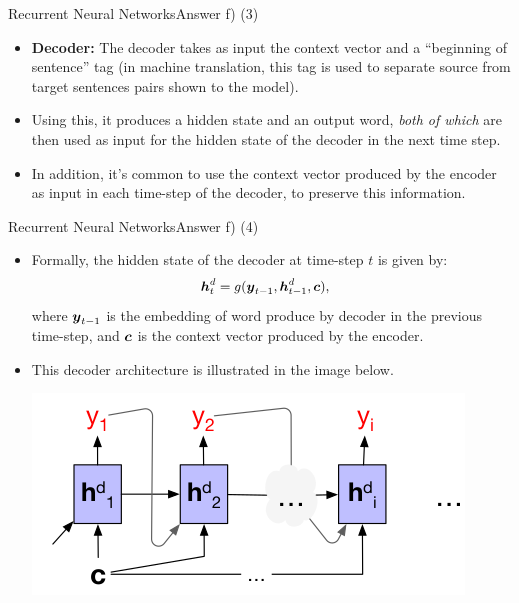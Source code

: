 \documentclass[t]{beamer}
\begin{document}
\begin{frame}{Recurrent Neural Networks}{Answer f) (3)}
    \begin{itemize}
        \item \textbf{Decoder:} The decoder takes as input the context vector
              and a ``beginning of sentence'' tag (in machine translation, this
              tag is used to separate source from target sentences pairs shown
              to the model).
        \item Using this, it produces a hidden state and an output word,
              \emph{both of which} are then used as input for the hidden state
              of the decoder in the next time step.
        \item In addition, it's common to use the context vector produced by
              the encoder as input in each time-step of the decoder, to preserve
              this information.
    \end{itemize}
\end{frame}

\begin{frame}{Recurrent Neural Networks}{Answer f) (4)}
    \begin{itemize}
        \item Formally, the hidden state of the decoder at time-step $t$ is
              given by:
              \begin{align*}
                  {\boldsymbol{h}}_t^d & = g({\boldsymbol{y}}_{t-1},{\boldsymbol{h}}_{t-1}^d,{\boldsymbol{c}}),
              \end{align*}
              where ${\boldsymbol{y}}_{t-1}$ is the embedding of word produce by decoder in
              the previous time-step, and ${\boldsymbol{c}}$ is the context vector produced
              by the encoder.
        \item This decoder architecture is illustrated in the image below.
              \begin{center}
                  \includegraphics[scale=0.5]{img/encoder_decoder_for_mt_1.png}
              \end{center}
    \end{itemize}
\end{frame}
\end{document}
